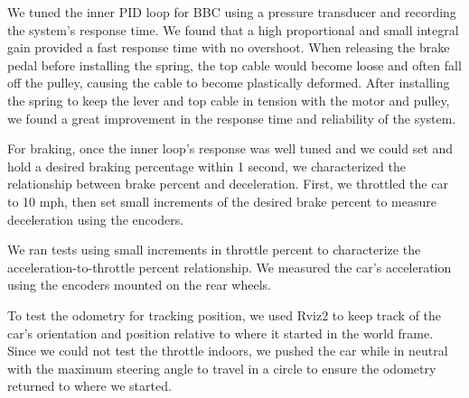 We tuned the inner PID loop for BBC using a pressure transducer and
recording the system's response time. We found that a high proportional
and small integral gain provided a fast response time with no
overshoot. When releasing the brake pedal before installing the spring,
the top cable would become loose and often fall off the pulley, causing
the cable to become plastically deformed. After installing the spring
to keep the lever and top cable in tension with the motor and pulley,
we found a great improvement in the response time and reliability of
the system.

For braking, once the inner loop's response was well tuned and we could
set and hold a desired braking percentage within 1 second, we
characterized the relationship between brake percent and deceleration.
First, we throttled the car to 10 mph, then set small increments of the
desired brake percent to measure deceleration using the encoders.

We ran tests using small increments in throttle percent to characterize
the acceleration-to-throttle percent relationship. We measured the
car's acceleration using the encoders mounted on the rear wheels.

To test the odometry for tracking position, we used Rviz2 to keep track
of the car's orientation and position relative to where it started in
the world frame. Since we could not test the throttle indoors, we
pushed the car while in neutral with the maximum steering angle to
travel in a circle to ensure the odometry returned to where we started.
